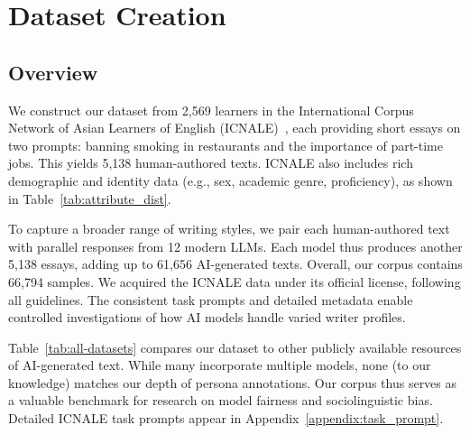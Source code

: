 \section{Dataset Creation}

\subsection{Overview}
We construct our dataset from 2,569 learners in the International Corpus Network of Asian Learners of English (ICNALE)~\citep{Ishikawa2013icnale}, each providing short essays on two prompts: banning smoking in restaurants and the importance of part-time jobs. This yields 5,138 human-authored texts. ICNALE also includes rich demographic and identity data (e.g., sex, academic genre, proficiency), as shown in Table~\ref{tab:attribute_dist}.

To capture a broader range of writing styles, we pair each human-authored text with parallel responses from 12 modern LLMs. Each model thus produces another 5,138 essays, adding up to 61,656 AI-generated texts. Overall, our corpus contains 66,794 samples. We acquired the ICNALE data under its official license, following all guidelines. The consistent task prompts and detailed metadata enable controlled investigations of how AI models handle varied writer profiles.

Table~\ref{tab:all-datasets} compares our dataset to other publicly available resources of AI-generated text. While many incorporate multiple models, none (to our knowledge) matches our depth of persona annotations. Our corpus thus serves as a valuable benchmark for research on model fairness and sociolinguistic bias. Detailed ICNALE task prompts appear in Appendix~\ref{appendix:task_prompt}.



